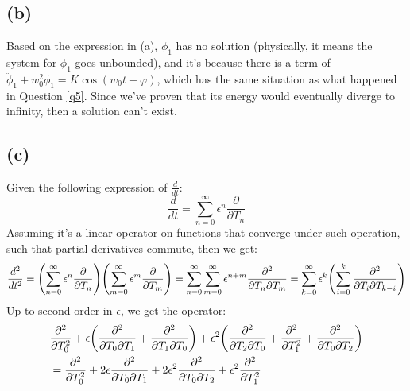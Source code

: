 \documentclass{article}
\DeclarePairedDelimiter{\paran}{(}{)}%
\begin{document}
\subsection*{(b)}
Based on the expression in (a), $\phi_1$ has no solution (physically, it means the system for $\phi_1$ goes unbounded), and it's because there is a term of $\ddot\phi_1+w_0^2\phi_1 = K\cos(w_0t+\varphi)$, which has the same situation as what happened in Question \ref{q5}. Since we've proven that its energy would eventually diverge to infinity, then a solution can't exist.

\subsection*{(c)}
Given the following expression of $\frac{d}{dt}$:
\begin{equation}
    \frac{d}{dt}=\sum_{n=0}^{\infty}\epsilon^n\frac{\partial}{\partial T_n}
\end{equation}
Assuming it's a linear operator on functions that converge under such operation, such that partial derivatives commute, then we get:
\begin{align}
    \frac{d^2}{dt^2} = \paran*{\sum_{n=0}^{\infty}\epsilon^n\frac{\partial}{\partial T_n}}\paran*{\sum_{m=0}^{\infty}\epsilon^m\frac{\partial}{\partial T_m}} = \sum_{n=0}^{\infty}\sum_{m=0}^{\infty}\epsilon^{n+m}\frac{\partial^2}{\partial T_n \partial T_m}= \sum_{k=0}^{\infty}\epsilon^k\paran*{\sum_{i=0}^{k}\frac{\partial^2}{\partial T_i \partial T_{k-i}}}
\end{align}
Up to second order in $\epsilon$, we get the operator: 
\begin{align}
    &\frac{\partial^2}{\partial T_0^2} + \epsilon\paran*{\frac{\partial^2}{\partial T_0\partial T_1}+\frac{\partial^2}{\partial T_1\partial T_0}} + \epsilon^2\paran*{\frac{\partial^2}{\partial T_2\partial T_0}+\frac{\partial^2}{\partial T_1^2}+\frac{\partial^2}{\partial T_0\partial T_2}}\\
    &= \frac{\partial^2}{\partial T_0^2}+2\epsilon\frac{\partial^2}{\partial T_0\partial T_1}+2\epsilon^2\frac{\partial^2}{\partial T_0\partial T_2}+\epsilon^2\frac{\partial^2}{\partial T_1^2}
\end{align}
\end{document}
